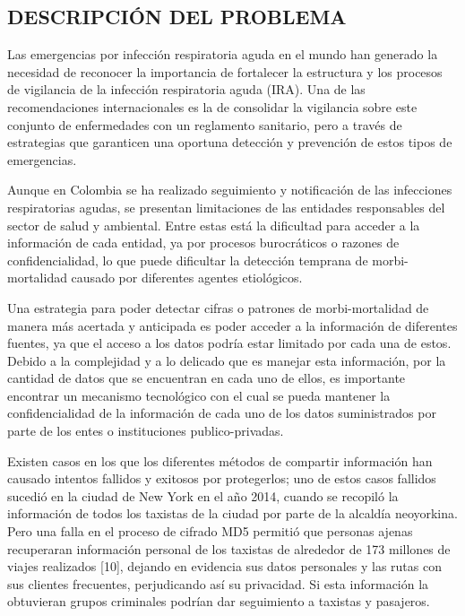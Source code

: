 \documentclass[a4paper, 12pt, oneside]{article}
\theoremstyle{definition}
\theoremstyle{remark}
\begin{document}
\subsection{DESCRIPCIÓN DEL PROBLEMA}

Las emergencias por infección respiratoria aguda en el mundo han generado la necesidad de reconocer la importancia de fortalecer la estructura y los procesos de vigilancia de la infección respiratoria
aguda (IRA). Una de las recomendaciones internacionales es la de consolidar la vigilancia sobre este conjunto de enfermedades con un reglamento sanitario, pero a través de estrategias que garanticen una oportuna detección y prevención de estos tipos de emergencias.

Aunque en Colombia se ha realizado seguimiento y notificación de las infecciones respiratorias agudas, se presentan limitaciones de las entidades responsables del sector de salud y ambiental. Entre estas está la dificultad para acceder a la información de cada entidad, ya por procesos burocráticos o razones de confidencialidad, lo que puede dificultar la detección temprana de morbi-mortalidad causado por diferentes agentes etiológicos.

Una estrategia para poder detectar cifras o patrones de morbi-mortalidad de manera más acertada y anticipada es poder acceder a la información de diferentes fuentes, ya que el acceso a los datos podría estar limitado por cada una de estos. Debido a la complejidad y a lo delicado que es manejar esta información, por la cantidad de datos que se encuentran en cada uno de ellos, es importante encontrar un mecanismo tecnológico con el cual se pueda mantener la confidencialidad de la información de cada uno de los datos suministrados por parte de los entes o instituciones publico-privadas.

Existen casos en los que los diferentes métodos de compartir información han causado intentos fallidos y exitosos por protegerlos; uno de estos casos fallidos sucedió en la ciudad de New York en el año 2014, cuando se recopiló la información de todos los taxistas de la ciudad por parte de la alcaldía neoyorkina. Pero una falla en el proceso de cifrado MD5 permitió que personas ajenas recuperaran información personal de los taxistas de alrededor de 173 millones de viajes realizados [10], dejando en evidencia sus datos personales y las rutas con sus clientes frecuentes,  perjudicando así su privacidad. Si esta información la obtuvieran grupos criminales podrían dar seguimiento a taxistas y pasajeros.
\end{document}
